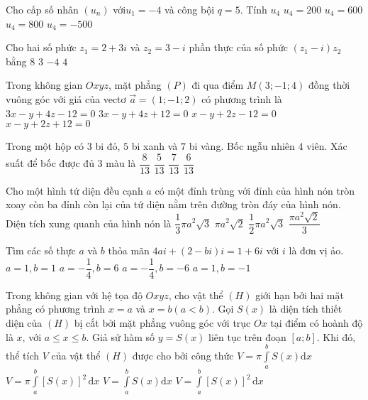 \begin{ex}%
Cho cấp số nhân $\left(u_n\right)$ với$ u_1=-4 $ và công bội $ q=5 $. Tính $ u_4 $
\choice
{$ u_4=200 $}
{$ u_4=600 $}
{$ u_4=800 $}
{\True $ u_4=-500 $}

\end{ex}
\begin{ex}%
Cho hai số phức $ z_1=2+3 i $ và $ z_2=3-i $ phần thực của số phức $ \left(z_1-i\right) z_2 $ bằng
\choice
{\True $8$}
{$3$}
{$-4$}
{$4$}

\end{ex}

\begin{ex}%
Trong không gian $O x y z$, mặt phẳng $(P)$ đi qua điểm $ M(3;-1; 4) $ đồng thời vuông góc với giá của vectơ $ \vec{a}=(1;-1; 2) $ có phương trình là
\choice
{$ 3 x-y+4 z-12=0 $}
{$ 3 x-y+4 z+12=0 $}
{$ x-y+2 z-12=0 $}
{\True $ x-y+2 z+12=0 $}

\end{ex}
\begin{ex}%
Trong một hộp có $3$ bi đỏ, $5$ bi xanh và $7$ bi vàng. Bốc ngẫu nhiên $4$ viên. Xác suất để bốc được đủ $3$ màu là
\choice
{$ \dfrac{8}{13} $}
{$ \dfrac{5}{13} $}
{$ \dfrac{7}{13} $}
{\True $ \dfrac{6}{13} $}

\end{ex}
\begin{ex}%
Cho một hình tứ diện đều cạnh $ a $ có một đỉnh trùng với đỉnh của hình nón tròn xoay còn ba đỉnh còn lại của tứ diện nằm trên đường tròn đáy của hình nón. Diện tích xung quanh của hình nón là
\choice
{\True $ \dfrac{1}{3} \pi a^2 \sqrt{3} $}
{$ \pi a^2 \sqrt{2} $}
{$ \dfrac{1}{2} \pi a^2 \sqrt{3} $}
{$ \dfrac{\pi a^2 \sqrt{2}}{3} $}

\end{ex}
\begin{ex}%
Tìm các số thực $ a $ và $ b $ thỏa mãn $ 4 a i+(2-b i) i=1+6 i $ với $ i $ là đơn vị ảo.
\choice
{\True $ a=1, b=1 $}
{$ a=-\dfrac{1}{4}, b=6 $}
{$ a=-\dfrac{1}{4}, b=-6 $}
{$ a=1, b=-1 $}

\end{ex}
\begin{ex}%
Trong không gian với hệ tọa độ $O x y z$, cho vật thể $ (H) $ giới hạn bởi hai mặt phẳng có phương trình $ x=a $ và $ x=b(a<b) $. Gọi $ S(x) $ là diện tích thiết diện của $ (H) $ bị cắt bởi mặt phẳng vuông góc với trục $ O x $ tại điểm có hoành độ là $x$, với $ a \leq x \leq b $. Giả sử hàm số $ y=S(x) $ liên tục trên đoạn $ [a; b] $. Khi đó, thể tích $ V $ của vật thể $ (H) $ được cho bởi công thức
\choice
{$ V=\pi \displaystyle\int\limits_a^{b} S(x) \mathrm{d} x $}
{$ V=\pi \displaystyle\int\limits_a^{b}[S(x)]^2 \mathrm{\,d} x $}
{\True $ V=\displaystyle\int\limits_a^{b} S(x) \mathrm{d} x $}
{$ V=\displaystyle\int\limits_a^{b}[S(x)]^2 \mathrm{\,d} x $}

\end{ex}

